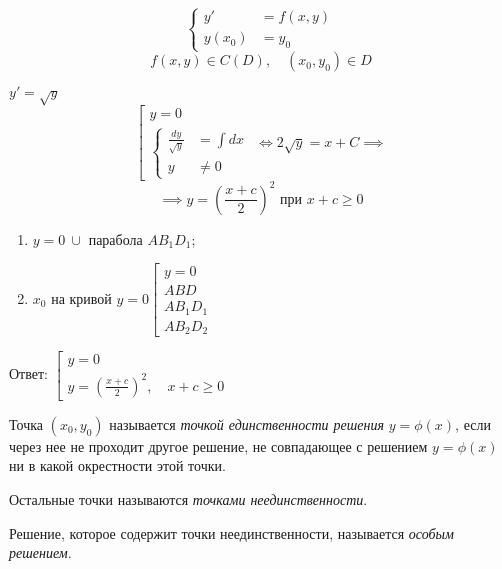 \begin{theorem}
    \begin{equation}\label{eq5}
        \left\{\begin{array}{rl}
            y'     & =f(x,y) \\
            y(x_0) & = y_0
        \end{array}\right.
    \end{equation}
    \[
        f(x,y) \in C(D), \quad (x_0, y_0) \in D
    \]
\end{theorem}

\begin{example}
    $y' = \sqrt{y}$
    \[
        \left[\begin{array}{l}
            y = 0 \\
            \left\{\begin{array}{rl}
                       \frac{dy}{\sqrt{y}} & = \int dx \\
                       y                   & \ne 0
                   \end{array}\right.
        \end{array}\right. \iff 2\sqrt{y} = x + C \implies
    \]
    \[
        \implies y = \left(\frac{x + c}{2}\right)^2\text{ при }x + c \geqslant 0
    \]

    \begin{enumerate}
        \item $y = 0 \ \cup$ парабола $AB_1D_1$;
        \item $x_0$ на кривой $y = 0 \left[\begin{array}{l}
                      y = 0   \\
                      ABD     \\
                      AB_1D_1 \\
                      AB_2D_2
                  \end{array}\right.$
    \end{enumerate}

    Ответ: $\left[\begin{array}{l}
            y = 0 \\
            y = \left(\frac{x + c}{2}\right)^2, \quad x + c \geqslant 0
        \end{array}\right.$
\end{example}

\begin{definition}
    Точка $(x_0, y_0)$ называется \emph{точкой единственности решения} $y = \phi(x)$, если через нее не проходит другое решение, не совпадающее с решением $y = \phi(x)$ ни в какой окрестности этой точки.

    Остальные точки называются \emph{точками неединственности}.

    Решение, которое содержит точки неединственности, называется \emph{особым решением}.
\end{definition}

